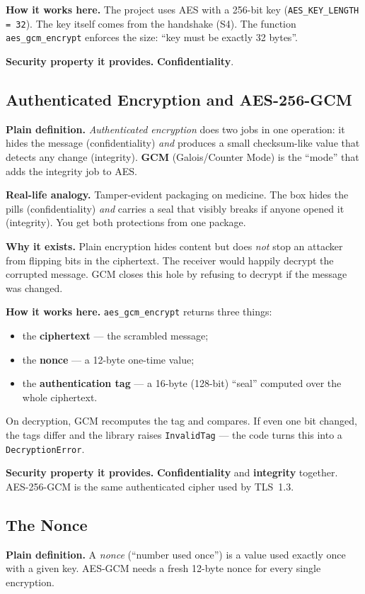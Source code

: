 \documentclass[11pt,a4paper]{report}
\begin{document}
\textbf{How it works here.} The project uses AES with a 256-bit key
(\texttt{AES\_KEY\_LENGTH = 32}). The key itself comes from the handshake (S4).
The function \texttt{aes\_gcm\_encrypt} enforces the size: ``key must be exactly
32 bytes''.

\textbf{Security property it provides.} \textbf{Confidentiality}.

\subsection{Authenticated Encryption and AES-256-GCM}
\textbf{Plain definition.} \emph{Authenticated encryption} does two jobs in one
operation: it hides the message (confidentiality) \emph{and} produces a small
checksum-like value that detects any change (integrity). \textbf{GCM}
(Galois/Counter Mode) is the ``mode'' that adds the integrity job to AES.

\textbf{Real-life analogy.} Tamper-evident packaging on medicine. The box hides
the pills (confidentiality) \emph{and} carries a seal that visibly breaks if
anyone opened it (integrity). You get both protections from one package.

\textbf{Why it exists.} Plain encryption hides content but does \emph{not} stop
an attacker from flipping bits in the ciphertext. The receiver would happily
decrypt the corrupted message. GCM closes this hole by refusing to decrypt if
the message was changed.

\textbf{How it works here.} \texttt{aes\_gcm\_encrypt} returns three things:
\begin{itemize}
  \item the \textbf{ciphertext} --- the scrambled message;
  \item the \textbf{nonce} --- a 12-byte one-time value;
  \item the \textbf{authentication tag} --- a 16-byte (128-bit) ``seal''
        computed over the whole ciphertext.
\end{itemize}
On decryption, GCM recomputes the tag and compares. If even one bit changed, the
tags differ and the library raises \texttt{InvalidTag} --- the code turns this
into a \texttt{DecryptionError}.

\textbf{Security property it provides.} \textbf{Confidentiality} and
\textbf{integrity} together. AES-256-GCM is the same authenticated cipher used
by TLS~1.3.

\subsection{The Nonce}
\textbf{Plain definition.} A \emph{nonce} (``number used once'') is a value used
exactly once with a given key. AES-GCM needs a fresh 12-byte nonce for every
single encryption.
\end{document}
